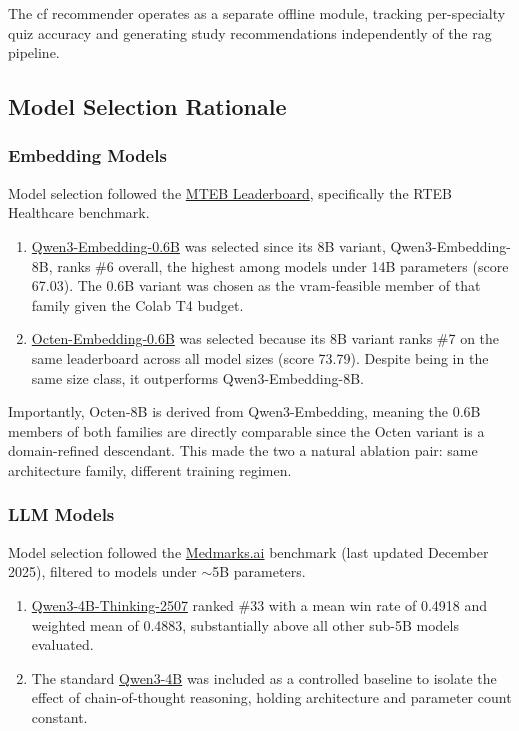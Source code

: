 The \gls{cf} recommender operates as a separate offline module, tracking per-specialty quiz accuracy and generating study recommendations independently of the \gls{rag} pipeline.

\subsection{Model Selection Rationale}
\label{sec:model_selection}

\subsubsection{Embedding Models}

Model selection followed the \href{https://huggingface.co/spaces/mteb/leaderboard}{MTEB Leaderboard}, specifically the RTEB Healthcare benchmark. 

\begin{enumerate}
    \item \href{https://huggingface.co/Qwen/Qwen3-Embedding-0.6B}{Qwen3-Embedding-0.6B} was selected since its 8B variant, Qwen3-Embedding-8B, ranks \#6 overall, the highest among models under 14B parameters (score 67.03). The 0.6B variant was chosen as the \gls{vram}-feasible member of that family given the Colab T4 budget. 
    
    \item \href{https://huggingface.co/Onten/Octen-Embedding-0.6B}{Octen-Embedding-0.6B} was selected because its 8B variant ranks \#7 on the same leaderboard across all model sizes (score 73.79). Despite being in the same size class, it outperforms Qwen3-Embedding-8B.
\end{enumerate}

Importantly, Octen-8B is derived from Qwen3-Embedding, meaning the 0.6B members of both families are directly comparable since the Octen variant is a domain-refined descendant. This made the two a natural ablation pair: same architecture family, different training regimen.

\subsubsection{LLM Models}
Model selection followed the \href{https://medmarks.ai}{Medmarks.ai} benchmark (last updated December 2025), filtered to models under $\sim$5B parameters.

\begin{enumerate}
    \item \href{https://huggingface.co/Qwen/Qwen3-4B-Thinking-2507}{Qwen3-4B-Thinking-2507} ranked \#33 with a mean win rate of 0.4918 and weighted mean of 0.4883, substantially above all other sub-5B models evaluated.
    \item The standard \href{https://huggingface.co/Qwen/Qwen3-4B}{Qwen3-4B} was included as a controlled baseline to isolate the effect of chain-of-thought reasoning, holding architecture and parameter count constant.
\end{enumerate}
